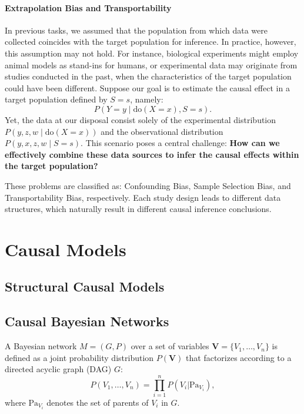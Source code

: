 \paragraph{Extrapolation Bias and Transportability}
In previous tasks, we assumed that the population from which data were collected coincides with the target population for inference. In practice, however, this assumption may not hold. For instance, biological experiments might employ animal models as stand-ins for humans, or experimental data may originate from studies conducted in the past, when the characteristics of the target population could have been different.
Suppose our goal is to estimate the causal effect in a target population defined by \(S = s\), namely:
\begin{equation*}
	P(Y = y \mid \text{do}(X = x), S = s).
\end{equation*}
Yet, the data at our disposal consist solely of the experimental distribution \(P(y,z,w\mid \text{do}(X=x))\) and the observational distribution \(P(y,x,z,w\mid S=s)\). This scenario poses a central challenge:
\textbf{How can we effectively combine these data sources to infer the causal effects within the target population?}

These problems are classified as: Confounding Bias, Sample Selection Bias, and Transportability Bias, respectively. Each study design leads to different data structures, which naturally result in different causal inference conclusions.

\section{Causal Models}

\subsection{Structural Causal Models}

\subsection{Causal Bayesian Networks}

\begin{definition}
	A Bayesian network \(M = (G, P)\) over a set of variables \(\mathbf{V} = \{V_1, \dots, V_n\}\) is defined as a joint probability distribution \(P(\mathbf{V})\) that factorizes according to a directed acyclic graph (DAG) \(G\):
	\begin{equation}
		P(V_1,\dots,V_n)=\prod_{i=1}^{n} P(V_i|\text{Pa}_{V_i}),
	\end{equation}
	where \(\text{Pa}_{V_i}\) denotes the set of parents of \(V_i\) in \(G\).
\end{definition}

